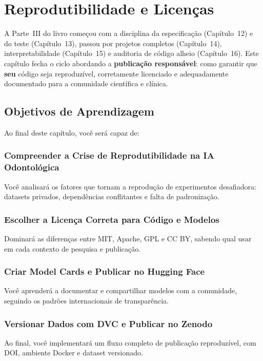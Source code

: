 \chapter{Reprodutibilidade e Licenças}
\label{cap:reprodutibilidade}
\nivelquatro

A Parte~III do livro começou com a disciplina da especificação (Capítulo~12)
e do teste (Capítulo~13), passou por projetos completos (Capítulo~14),
interpretabilidade (Capítulo~15) e auditoria de código alheio
(Capítulo~16). Este capítulo fecha o ciclo abordando a \textbf{publicação
responsável}: como garantir que \textbf{seu} código seja reproduzível,
corretamente licenciado e adequadamente documentado para a comunidade
científica e clínica.

\section{Objetivos de Aprendizagem}

Ao final deste capítulo, você será capaz de:

\subsection{Compreender a Crise de Reprodutibilidade na IA Odontológica}
Você analisará os fatores que tornam a reprodução de experimentos desafiadora: datasets privados, dependências conflitantes e falta de padronização.

\subsection{Escolher a Licença Correta para Código e Modelos}
Dominará as diferenças entre MIT, Apache, GPL e CC BY, sabendo qual usar em cada contexto de pesquisa e publicação.

\subsection{Criar Model Cards e Publicar no Hugging Face}
Você aprenderá a documentar e compartilhar modelos com a comunidade, seguindo os padrões internacionais de transparência.

\subsection{Versionar Dados com DVC e Publicar no Zenodo}
Ao final, você implementará um fluxo completo de publicação reproduzível, com DOI, ambiente Docker e dataset versionado.

